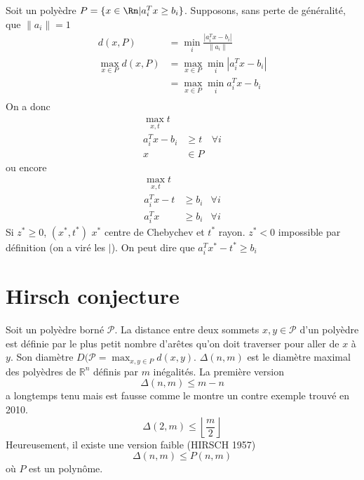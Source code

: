 Soit un polyèdre $P = \{x\in\Rn|a_i^Tx \geq b_i\}$.
Supposons, sans perte de généralité, que $\|a_i\| = 1$
\begin{align*}
  d(x, P) & = \min_i \frac{|a_i^Tx - b_i|}{\|a_i\|}\\
  \max_{x\in P} d(x, P)
  & = \max_{x\in P}\min_i |a_i^Tx - b_i|\\
  & = \max_{x\in P}\min_i a_i^Tx - b_i\\
\end{align*}
On a donc
\begin{align*}
  \max_{x, t} t\\
  a_i^Tx - b_i & \geq t & \forall i\\
  x & \in P
\end{align*}
ou encore
\begin{align*}
  \max_{x, t} t\\
  a_i^Tx - t & \geq b_i & \forall i\\
  a_i^Tx & \geq b_i & \forall i %
\end{align*}
Si $z^* \geq 0$, $(x^*, t^*)$
$x^*$ centre de Chebychev et $t^*$ rayon.
$z^* < 0$ impossible par définition (on a viré les $|$).
On peut dire que $a_i^Tx^* -t^* \geq b_i$

\section{Hirsch conjecture}
Soit un polyèdre borné $\mathcal{P}$.
La distance entre deux sommets $x, y \in \mathcal{P}$ d'un polyèdre
est définie par le plus petit nombre d'arêtes qu'on doit traverser pour aller
de $x$ à $y$.
Son diamètre $D(\mathcal{P} = \max_{x, y \in P} d(x, y)$.
$\Delta(n, m)$ est le diamètre maximal des polyèdres de $\mathbb{R}^n$
définis par $m$ inégalités.
La première version
\[ \Delta(n, m) \leq m-n \]
a longtemps tenu mais est fausse comme le montre un contre exemple trouvé
en 2010.
\[ \Delta(2, m) \leq \left\lfloor\frac{m}{2}\right\rfloor \]
Heureusement, il existe une version faible (HIRSCH 1957)
\[ \Delta(n, m) \leq P(n, m) \]
où $P$ est un polynôme.


